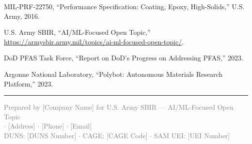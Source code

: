 \documentclass[11pt,letterpaper]{article}
\begin{document}
\begin{enumerate}[nosep, label={[\arabic*]}]
\item MIL-PRF-22750, ``Performance Specification: Coating, Epoxy, High-Solids,'' U.S. Army, 2016.

\item U.S. Army SBIR, ``AI/ML-Focused Open Topic,'' \url{https://armysbir.army.mil/topics/ai-ml-focused-open-topic/}.

\item DoD PFAS Task Force, ``Report on DoD's Progress on Addressing PFAS,'' 2023.

\item Argonne National Laboratory, ``Polybot: Autonomous Materials Research Platform,'' 2023.

\end{enumerate}

\vspace{1cm}
\noindent\textcolor{armygreen}{\rule{\textwidth}{1.5pt}}

\begin{center}
\small\textcolor{gray}{
Prepared by [Company Name] for U.S. Army SBIR --- AI/ML-Focused Open Topic\\
[Company Name] $\cdot$ [Address] $\cdot$ [Phone] $\cdot$ [Email]\\
DUNS: [DUNS Number] $\cdot$ CAGE: [CAGE Code] $\cdot$ SAM UEI: [UEI Number]
}
\end{center}
\end{document}
